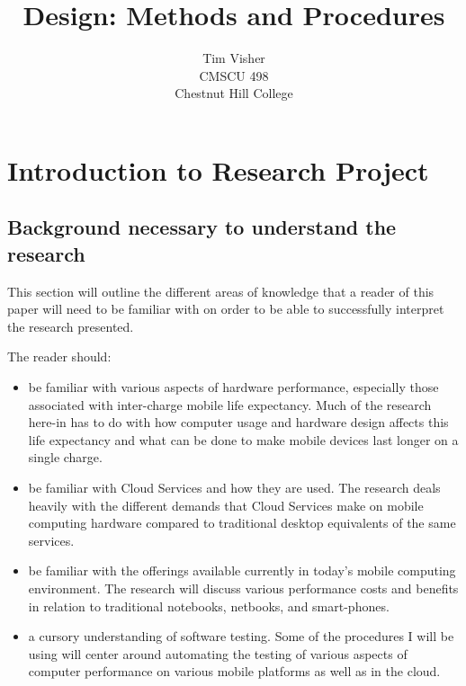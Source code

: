 \documentclass[12pt,oneside,letterpaper]{article}
\author{Tim Visher\\ CMSCU 498\\ Chestnut Hill College}
\title{Design: Methods and Procedures}
\begin{document}
\maketitle

\tableofcontents

\section{Introduction to Research Project}

\subsection{Background necessary to understand the research}

This section will outline the different areas of knowledge that a reader of this
paper will need to be familiar with on order to be able to successfully
interpret the research presented.

The reader should:

\begin{itemize}

\item be familiar with various aspects of hardware performance, especially those
  associated with inter-charge mobile life expectancy.  Much of the research
  here-in has to do with how computer usage and hardware design affects this
  life expectancy and what can be done to make mobile devices last longer on a
  single charge.

\item be familiar with Cloud Services and how they are used.  The research deals
  heavily with the different demands that Cloud Services make on mobile
  computing hardware compared to traditional desktop equivalents of the same
  services.

\item be familiar with the offerings available currently in today's mobile
  computing environment.  The research will discuss various performance costs
  and benefits in relation to traditional notebooks, netbooks, and smart-phones.

\item a cursory understanding of software testing.  Some of the procedures I
  will be using will center around automating the testing of various aspects of
  computer performance on various mobile platforms as well as in the cloud.

\end{itemize}
\end{document}
